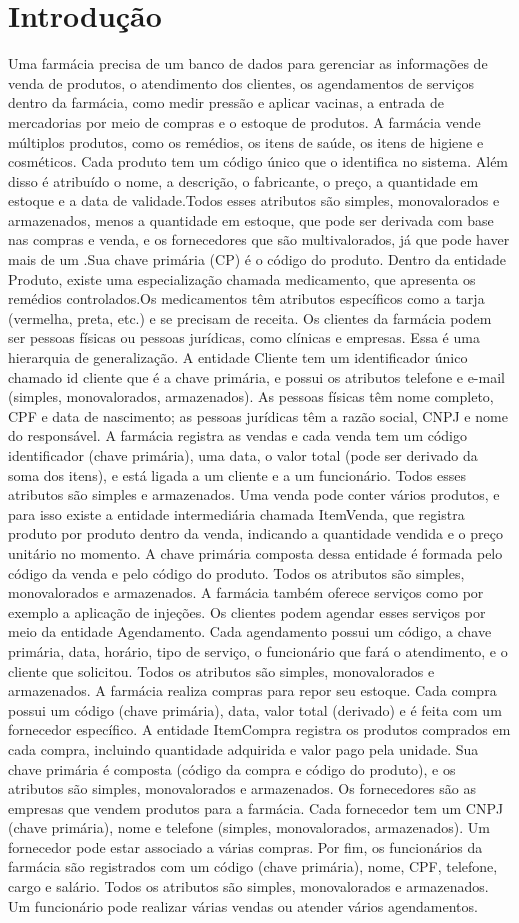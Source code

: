 \documentclass{article}
\begin{document}
\section{Introdução}
Uma farmácia precisa de um banco de dados para gerenciar as informações de venda de produtos, o atendimento dos clientes, os agendamentos de serviços dentro da farmácia, como medir pressão e aplicar vacinas, a entrada de mercadorias por meio de compras e o estoque de produtos. A farmácia vende múltiplos produtos, como os remédios, os itens de saúde, os itens de higiene e cosméticos. Cada produto tem um código único que o identifica no sistema.  Além disso é atribuído o nome, a descrição, o fabricante, o preço, a quantidade em estoque e a data de validade.Todos esses atributos são simples, monovalorados e armazenados, menos a quantidade em estoque, que pode ser derivada com base nas compras e venda, e os fornecedores que são multivalorados, já que pode haver mais de um .Sua chave primária (CP) é o código do produto. Dentro da entidade Produto, existe uma especialização chamada medicamento, que apresenta os remédios controlados.Os medicamentos têm atributos específicos como a tarja (vermelha, preta, etc.) e se precisam de receita. Os clientes da farmácia podem ser pessoas físicas ou pessoas jurídicas, como clínicas e empresas. Essa é uma hierarquia de generalização. A entidade Cliente tem um identificador único chamado id cliente que é a chave primária, e possui os atributos telefone e e-mail (simples, monovalorados, armazenados). As pessoas físicas têm nome completo, CPF e data de nascimento; as pessoas jurídicas têm a razão social, CNPJ e nome do responsável. A farmácia registra as vendas e cada venda tem um código identificador (chave primária), uma data, o valor total (pode ser derivado da soma dos itens), e está ligada a um cliente e a um funcionário. Todos esses atributos são simples e armazenados. Uma venda pode conter vários produtos, e para isso existe a entidade intermediária chamada ItemVenda, que registra produto por produto dentro da venda, indicando a quantidade vendida e o preço unitário no momento. A chave primária composta dessa entidade é formada pelo código da venda e pelo código do produto. Todos os atributos são simples, monovalorados e armazenados. A farmácia também oferece serviços como por exemplo a aplicação de injeções. Os clientes podem agendar esses serviços por meio da entidade Agendamento. Cada agendamento possui um código, a chave primária, data, horário, tipo de serviço, o funcionário que fará o atendimento, e o cliente que solicitou. Todos os atributos são simples, monovalorados e armazenados. A farmácia realiza compras para repor seu estoque. Cada compra possui um código (chave primária), data, valor total (derivado) e é feita com um fornecedor específico. A entidade ItemCompra registra os produtos comprados em cada compra, incluindo quantidade adquirida e valor pago pela unidade. Sua chave primária é composta (código da compra e código do produto), e os atributos são simples, monovalorados e armazenados. Os fornecedores são as empresas que vendem produtos para a farmácia. Cada fornecedor tem um CNPJ (chave primária), nome e telefone (simples, monovalorados, armazenados). Um fornecedor pode estar associado a várias compras. Por fim, os funcionários da farmácia são registrados com um código (chave primária), nome, CPF, telefone, cargo e salário. Todos os atributos são simples, monovalorados e armazenados. Um funcionário pode realizar várias vendas ou atender vários agendamentos. 

\newpage
\end{document}
